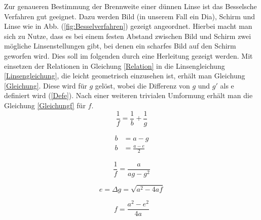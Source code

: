 Zur genaueren Bestimmung der Brennweite einer dünnen Linse ist das Besselsche Verfahren gut geeignet. Dazu werden Bild (in unserem Fall ein Dia), Schirm und Linse wie in Abb. (\ref{fig:Besselverfahren}) gezeigt angeordnet. Hierbei macht man sich zu Nutze, dass es bei einem festen Abstand zwischen Bild und Schirm zwei mögliche Linsenstellungen gibt, bei denen ein scharfes Bild auf den Schirm geworfen wird. Dies soll im folgenden durch eine Herleitung gezeigt werden.
Mit einsetzen der Relationen in Gleichung \ref{Relation} in die Linsengleichung \ref{Linsengleichung}, die leicht geometrisch einzusehen ist, erhält man Gleichung \ref{Gleichung}. Diese wird für $g$ gelöst, wobei die Differenz von $g$ und $g'$ als e definiert wird (\ref{Defe}). Nach einer weiteren trivialen Umformung erhält man die Gleichung \ref{Gleichungf} für $f$.\\

\begin{equation} \label{Linsengleichung}
    \frac{1}{f} = \frac{1}{b} + \frac{1}{g}
\end{equation}

\begin{align} \label{Relation}
    b &= a - g   \\
    \nonumber b &= \frac{a-e}{2} 
\end{align}

\begin{equation} \label{Gleichung}
    \frac{1}{f} = \frac{a}{ag-g^2}
\end{equation}

\begin{equation} \label{Defe}
    e = \Delta g = \sqrt{a^2-4af}
\end{equation}

\begin{equation} \label{Gleichungf}
    f = \frac{a^2-e^2}{4a}
\end{equation}

